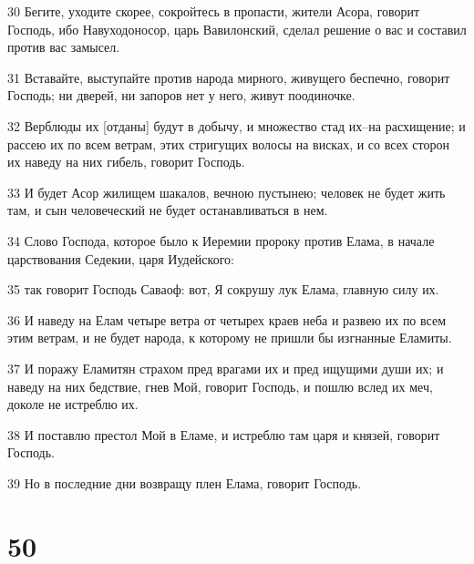 \par 30 Бегите, уходите скорее, сокройтесь в пропасти, жители Асора, говорит Господь, ибо Навуходоносор, царь Вавилонский, сделал решение о вас и составил против вас замысел.
\par 31 Вставайте, выступайте против народа мирного, живущего беспечно, говорит Господь; ни дверей, ни запоров нет у него, живут поодиночке.
\par 32 Верблюды их [отданы] будут в добычу, и множество стад их--на расхищение; и рассею их по всем ветрам, этих стригущих волосы на висках, и со всех сторон их наведу на них гибель, говорит Господь.
\par 33 И будет Асор жилищем шакалов, вечною пустынею; человек не будет жить там, и сын человеческий не будет останавливаться в нем.
\par 34 Слово Господа, которое было к Иеремии пророку против Елама, в начале царствования Седекии, царя Иудейского:
\par 35 так говорит Господь Саваоф: вот, Я сокрушу лук Елама, главную силу их.
\par 36 И наведу на Елам четыре ветра от четырех краев неба и развею их по всем этим ветрам, и не будет народа, к которому не пришли бы изгнанные Еламиты.
\par 37 И поражу Еламитян страхом пред врагами их и пред ищущими души их; и наведу на них бедствие, гнев Мой, говорит Господь, и пошлю вслед их меч, доколе не истреблю их.
\par 38 И поставлю престол Мой в Еламе, и истреблю там царя и князей, говорит Господь.
\par 39 Но в последние дни возвращу плен Елама, говорит Господь.

\chapter{50}

